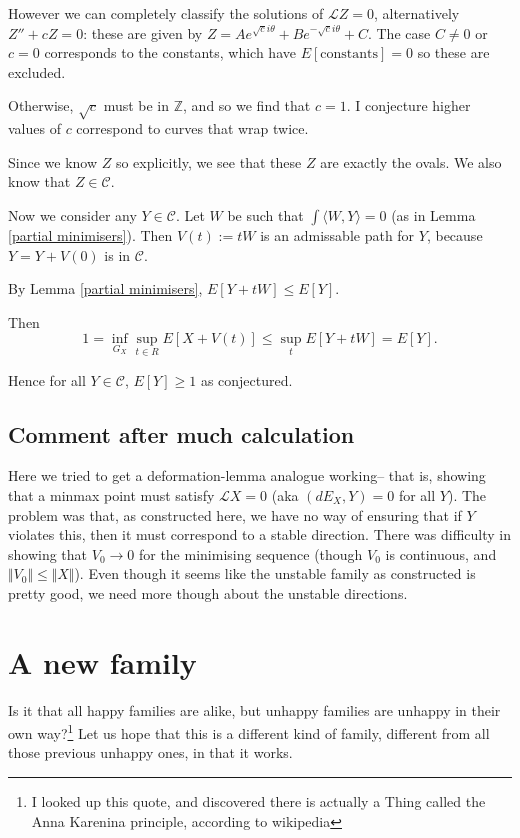 \documentclass[12pt, a4paper]{amsart}
\theoremstyle{remark}
\begin{document}
However we can completely classify the solutions of $\mathcal{L}Z=0$, alternatively $Z''+cZ=0$:  these are given by $Z= Ae^{\sqrt{c} i\theta} + Be^{-\sqrt{c} i\theta}+ C$.   The case $C\not= 0$ or $c=0$ corresponds to the constants, which have $E[\text{constants}]=0$ so these are excluded.   

Otherwise, $\sqrt{c}$ must be in $\mathbb{Z}$, and so we find that $c=1$.    I conjecture higher values of $c$ correspond to curves that wrap twice. 

Since we know $Z$ so explicitly, we see that these $Z$ are exactly the ovals.     We also know that $Z\in\mathcal{C}$. 

Now we consider any $Y\in\mathcal{C}$.   Let $W$ be such that $\int\langle W,Y\rangle=0$ (as in  Lemma \ref{partial minimisers}).     Then $V(t):=tW$ is an admissable path for $Y$, because $Y=Y+V(0)$ is in $\mathcal{C}$.    

By Lemma \ref{partial minimisers}, $E[Y+tW]\le E[Y]$.    

Then 
$$ 1= \inf_{G_X} \sup_{t\in R} E[X+V(t)]\le  \sup_{t} E[Y+tW]=E[Y].$$

Hence for all $Y\in\mathcal{C}$, $E[Y]\ge 1$ as conjectured.  


\bigskip

\subsection*{Comment after much calculation}  Here we tried to get a deformation-lemma analogue working-- that is, showing that a minmax point must satisfy $\mathcal{L}X=0$ (aka $(dE_X,Y)=0$ for all $Y$).    The problem was that, as constructed here, we have no way of ensuring that if $Y$ violates this, then it must correspond to a stable direction.   There was difficulty in showing that $V_0\rightarrow 0$ for the minimising sequence (though $V_0$ is continuous, and $\Vert V_0\Vert \le \Vert X\Vert$).     Even though it seems like the unstable family as constructed is pretty good, we need more though about the unstable directions.

\newpage
\section*{A new family}
Is it that all happy families are alike, but unhappy families are unhappy in their own way?\footnote{I looked up this quote, and discovered there is actually a Thing called the Anna Karenina principle, according to wikipedia}   Let us hope that this is a different kind of family, different from all those previous unhappy ones, in that it works.
\end{document}

